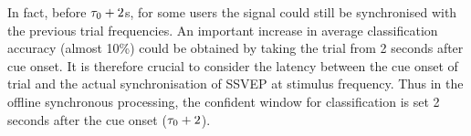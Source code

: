In fact, before $\tau_0 + 2$s, for some users the signal could still be synchronised with the previous trial frequencies. 
An important increase in average classification accuracy (almost 10\%) could be obtained by taking the trial from 2 seconds after cue onset.
It is therefore crucial to consider the latency between the cue onset of trial and the actual synchronisation of SSVEP at stimulus frequency. 
Thus in the offline synchronous processing, the confident window for classification is set 2 seconds after the cue onset ($\tau_0+2$).
